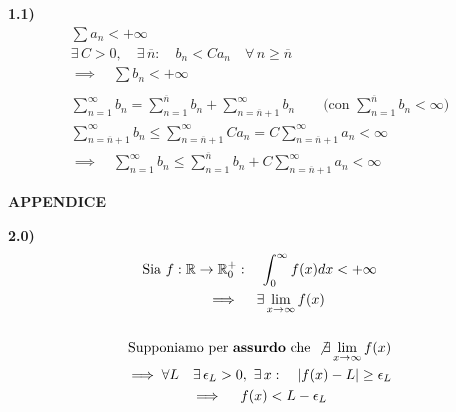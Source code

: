 \documentclass[11pt,reqno]{amsart}
\begin{document}
{\bf 1.1)}
\begin{gather*}
 \sum a_n < +\infty\\
 \exists \, C > 0, \quad \exists \, \overline{n}: \quad b_n < Ca_n \quad \forall \, n \geq \overline{n}\\
 \implies \quad \sum b_n < +\infty\\\\
 \sum_{n = 1}^{\infty} b_n = \sum_{n = 1}^{\overline{n}} b_n + \sum_{n = \overline{n} + 1}^{\infty} b_n \quad \quad \text{(con } \sum_{n = 1}^{\overline{n}} b_n < \infty \text{)}\\
 \sum_{n = \overline{n} + 1}^{\infty} b_n \leq \sum_{n = \overline{n} + 1}^{\infty} Ca_n = C\sum_{n = \overline{n} + 1}^{\infty} a_n < \infty\\
 \implies \quad \sum_{n = 1}^{\infty} b_n \leq \sum_{n = 1}^{\overline{n}} b_n + C\sum_{n = \overline{n} + 1}^{\infty} a_n < \infty
\end{gather*}

\newpage

\iffalse
\centerline{\bf APPENDICE }
{\bf 2.0)}
\begin{gather*}
 \text{Sia } f:\mathbb{R}\to\mathbb{R}_0^{+}: \quad \int_{0}^{\infty} f(x) dx < +\infty\\
 \quad \implies \quad \exists \lim_{x \to \infty} f(x)\\\\
 \text{Supponiamo per } \textbf{assurdo} \text{ che } \not\exists \lim_{x \to \infty} f(x)\\
 \implies \forall L \quad \exists \, \epsilon_{L} > 0, \,\, \exists \, x: \quad |f(x) - L| \geq \epsilon_{L}\\
 \implies \quad f(x) < L - \epsilon_{L}
\end{gather*}
\end{document}
